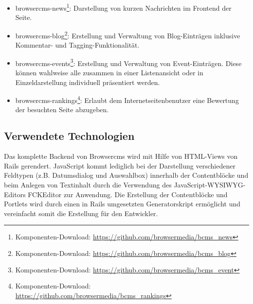 \begin{itemize}
\item browsercms-news\footnote{Komponenten-Download: \href{https://github.com/browsermedia/bcms\_news}{https://github.com/browsermedia/bcms\_news}}: Darstellung von kurzen Nachrichten im Frontend der Seite.
\item browsercms-blog\footnote{Komponenten-Download: \href{https://github.com/browsermedia/bcms\_blog}{https://github.com/browsermedia/bcms\_blog}}: Erstellung und Verwaltung von Blog-Einträgen inklusive Kommentar- und Tagging-Funktionalität.
\item browsercms-events\footnote{Komponenten-Download: \href{https://github.com/browsermedia/bcms\_event}{https://github.com/browsermedia/bcms\_event}}: Erstellung und Verwaltung von Event-Einträgen. Diese können wahlweise alle zusammen in einer Listenansicht oder in Einzeldarstellung individuell präsentiert werden.
\item browsercms-rankings\footnote{Komponenten-Download: \href{https://github.com/browsermedia/bcms\_rankings}{https://github.com/browsermedia/bcms\_rankings}}: Erlaubt dem Internetseitenbenutzer eine Bewertung der besuchten Seite abzugeben.
\end{itemize}

\subsection{Verwendete Technologien}

Das komplette Backend von Browsercms wird mit Hilfe von HTML-Views von Rails gerendert. JavaScript kommt lediglich bei der Darstellung verschiedener Feldtypen (z.B. Datumsdialog und Auswahlbox) innerhalb der Contentblöcke und beim Anlegen von Textinhalt durch die Verwendung des JavaScript-WYSIWYG-Editors FCKEditor zur Anwendung. Die Erstellung der Contentblöcke und Portlets wird durch einen in Rails umgesetzten Generatorskript ermöglicht und vereinfacht somit die Erstellung für den Entwickler.


\newpage
